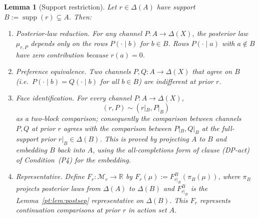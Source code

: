 \documentclass[11pt,a4paper]{article}
\newtheorem{lemma}[theorem]{Lemma}
\theoremstyle{definition}
\newcommand{\R}{\mathbb R}
\newcommand{\1}{\mathbf 1}
\begin{document}
\begin{lemma}[Support restriction]\label{pt:lem:supprestrict}
Let $r\in\Delta(A)$ have support $B:=\operatorname{supp}(r)\subsetneq A$.  Then:
\begin{enumerate}
\item[(i)] \emph{Posterior-law reduction.}  For any channel $P:A\to\Delta(X)$, the posterior law $\mu_{r,P}$ depends only
on the rows $P(\cdot\mid b)$ for $b\in B$.  Rows $P(\cdot\mid a)$ with $a\notin B$ have zero contribution because $r(a)=0$.
\item[(ii)] \emph{Preference equivalence.}  Two channels $P,Q:A\to\Delta(X)$ that agree on $B$ (i.e.\ $P(\cdot\mid b)=Q(\cdot\mid b)$
for all $b\in B$) are indifferent at prior $r$.
\item[(iii)] \emph{Face identification.}  For every channel $P:A\to\Delta(X)$,
\[
(r,P)\sim(r|_B,P|_B)
\]
as a two-block comparison; consequently the comparison between channels $P,Q$ at prior $r$ agrees with the comparison
between $P|_B,Q|_B$ at the full-support prior $r|_B\in\Delta(B)$.  This is proved by projecting $A$ to $B$ and embedding
$B$ back into $A$, using the all-completions form of clause \textup{(DP-act)} of Condition~\textup{(P4)} for the embedding.
\item[(iv)] \emph{Representative.}  Define $F_r:\mathcal M_r\to\R$ by $F_r(\mu):=F_{r|_B}^B(\pi_B(\mu))$, where $\pi_B$
projects posterior laws from $\Delta(A)$ to $\Delta(B)$ and $F_{r|_B}^B$ is the Lemma~\ref{pt:lem:postsep} representative
on $\Delta(B)$.  This $F_r$ represents continuation comparisons at prior $r$ in action set $A$.
\end{enumerate}
\end{lemma}
\end{document}

